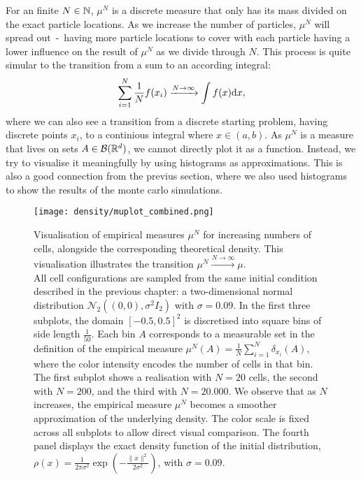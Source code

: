 For an finite $N \in \mathbb{N}$, $\mu^{N}$ is a discrete measure that only has its mass divided on the exact particle locations. 
As we increase the number of particles, $\mu^{N}$ will spread out \,-\, having more particle locations to cover with each particle having a lower influence on the result of $\mu^{N}$ as we divide through $N$.
This process is quite simular to the transition from a sum to an according integral:
\[ \sum\limits_{i=1}^{N} \frac{1}{N} f(x_i) \xrightarrow{N \to \infty} \int f(x) \mathrm{d} x,  \]
where we can also see a transition from a discrete starting problem, having discrete points ${x_i}$, to a continious integral where $x \in (a,b)$. 
As $\mu^N$ is a measure that lives on sets $A \in \mathcal{B}(\mathbb{R}^d)$, we cannot directly plot it as a function. 
Instead, we try to visualise it meaningfully by using histograms as approximations.
This is also a good connection from the previus section, where we also used histograms to show the results of the monte carlo simulations. 

\begin{figure}
	\begin{center}
		\texttt{[image: density/muplot\_combined.png]}
		\caption{
            Visualisation of empirical measures $\mu^N$ for increasing numbers of cells, alongside the corresponding theoretical density. 
            This visualisation illustrates the transition \( \mu^N \xrightarrow{N \to \infty} \mu\). \\
            All cell configurations are sampled from the same initial condition described in the previous chapter: a two-dimensional normal distribution \( \mathcal{N}_2((0,0), \sigma^2 I_2) \) with \( \sigma = 0.09 \). 
            In the first three subplots, the domain \([-0.5, 0.5]^2\) is discretised into square bins of side length \(\frac{1}{50}\). 
            Each bin \( A \) corresponds to a measurable set in the definition of the empirical measure \( \mu^N(A) = \frac{1}{N} \sum_{i=1}^N \delta_{x_i}(A) \), where the color intensity encodes the number of cells in that bin. \\
            The first subplot shows a realisation with \( N = 20 \) cells, the second with \( N = 200 \), and the third with \( N = 20{.}000 \). 
            We observe that as \( N \) increases, the empirical measure \( \mu^N \) becomes a smoother approximation of the underlying density. 
            The color scale is fixed across all subplots to allow direct visual comparison.
            The fourth panel displays the exact density function of the initial distribution, \( \rho(x) = \frac{1}{2\pi\sigma^2} \exp\left( -\frac{\|x\|^2}{2\sigma^2} \right) \), with \( \sigma = 0.09 \). 
         }
		\label{fig:muTransition}
	\end{center}
\end{figure}

